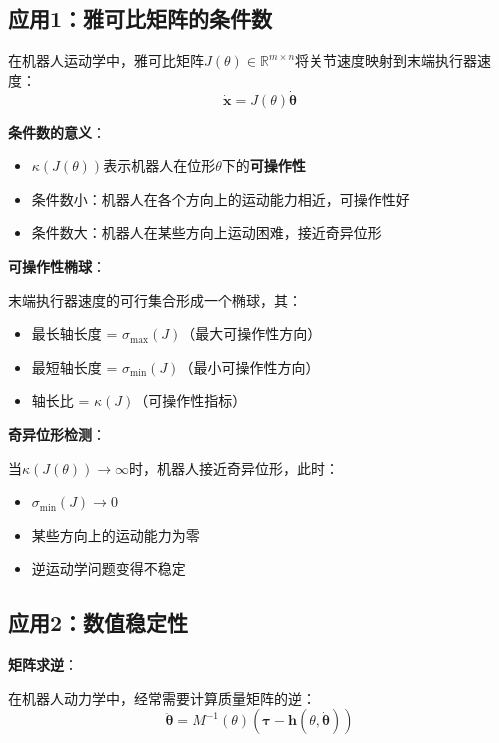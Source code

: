 \documentclass[12pt,a4paper]{article}
\begin{document}
\subsection{应用1：雅可比矩阵的条件数}

在机器人运动学中，雅可比矩阵$J(\theta) \in \mathbb{R}^{m \times n}$将关节速度映射到末端执行器速度：
\begin{equation}
\dot{\bm{x}} = J(\theta) \dot{\bm{\theta}}
\end{equation}

\textbf{条件数的意义}：
\begin{itemize}
\item $\kappa(J(\theta))$表示机器人在位形$\theta$下的\textbf{可操作性}
\item 条件数小：机器人在各个方向上的运动能力相近，可操作性好
\item 条件数大：机器人在某些方向上运动困难，接近奇异位形
\end{itemize}

\textbf{可操作性椭球}：

末端执行器速度的可行集合形成一个椭球，其：
\begin{itemize}
\item 最长轴长度 = $\sigma_{\max}(J)$（最大可操作性方向）
\item 最短轴长度 = $\sigma_{\min}(J)$（最小可操作性方向）
\item 轴长比 = $\kappa(J)$（可操作性指标）
\end{itemize}

\textbf{奇异位形检测}：

当$\kappa(J(\theta)) \to \infty$时，机器人接近奇异位形，此时：
\begin{itemize}
\item $\sigma_{\min}(J) \to 0$
\item 某些方向上的运动能力为零
\item 逆运动学问题变得不稳定
\end{itemize}

\subsection{应用2：数值稳定性}

\textbf{矩阵求逆}：

在机器人动力学中，经常需要计算质量矩阵的逆：
\begin{equation}
\ddot{\bm{\theta}} = M^{-1}(\theta)(\bm{\tau} - \bm{h}(\theta, \dot{\bm{\theta}}))
\end{equation}
\end{document}
